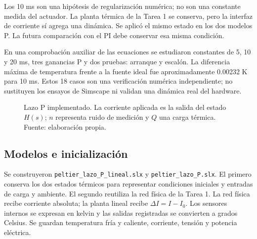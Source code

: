 \documentclass[journal,twocolumn]{IEEEtran}
\begin{document}
Los 10 ms son una hipótesis de regularización numérica; no son una constante medida del actuador. La planta térmica de la Tarea 1 se conserva, pero la interfaz de corriente sí agrega una dinámica. Se aplicó el mismo estado en los dos modelos P. La futura comparación con el PI debe conservar esa misma condición.

En una comprobación auxiliar de las ecuaciones se estudiaron constantes de 5, 10 y 20 ms, tres ganancias P y dos pruebas: arranque y escalón. La diferencia máxima de temperatura frente a la fuente ideal fue aproximadamente 0.00232 K para 10 ms. Estos 18 casos son una verificación numérica independiente; no sustituyen los ensayos de Simscape ni validan una dinámica real del hardware.

\begin{figure}[!tbp]
\centering
{}
\caption{Lazo P implementado. La corriente aplicada es la salida del estado $H(s)$; $n$ representa ruido de medición y $Q$ una carga térmica. Fuente: elaboración propia.}
\label{fig:lazo}
\end{figure}

\subsection{Modelos e inicialización}
Se construyeron \texttt{peltier\_lazo\_P\_lineal.slx} y \texttt{peltier\_lazo\_P.slx}. El primero conserva los dos estados térmicos para representar condiciones iniciales y entradas de carga y ambiente. El segundo reutiliza la red física de la Tarea 1. La red física recibe corriente absoluta; la planta lineal recibe $\Delta I=I-I_0$. Los sensores internos se expresan en kelvin y las salidas registradas se convierten a grados Celsius. Se guardan temperatura fría y caliente, corriente, tensión y potencia eléctrica.
\end{document}
